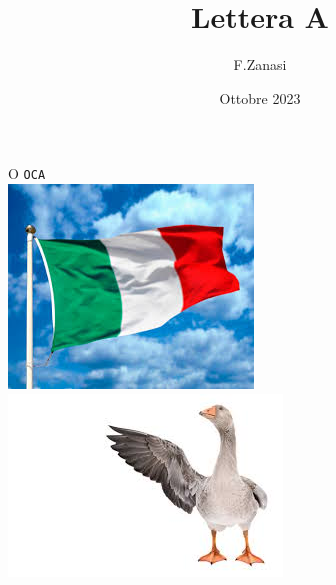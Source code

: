 \documentclass[]{article}
\title{Lettera A}
\author{F.Zanasi}
\date{Ottobre 2023}
\begin{document}
{\fontsize{150}{160}\selectfont O} 
\hspace{2.0in}
{\fontsize{80}{80}\color{blue}\texttt{O}\color{black}\texttt{CA}} 
\\[1.5cm]
\includegraphics[scale=0.4]{flag-IT1}
\includegraphics[scale=0.4]{oca}
\end{document}
